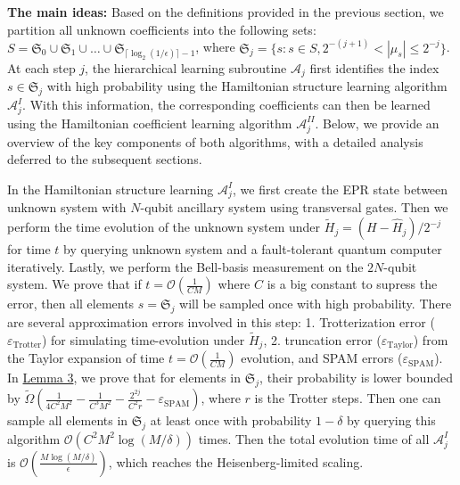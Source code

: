 \documentclass[twocolumn,superscriptaddress,aps,showpacs,amsmath,amstex,amssymb,citeautoscript,floatfix,pra,preprintnumbers]{revtex4-2}
\newcounter{alg}
\theoremstyle{plain}
\theoremstyle{plain}
\theoremstyle{plain}
\theoremstyle{plain}
\theoremstyle{plain}
\theoremstyle{plain}
\begin{document}
\begin{appendix}
\textbf{The main ideas: }Based on the definitions provided in the previous section, we partition all unknown coefficients into the following sets: $S=\mathfrak{S}_{0}\cup \mathfrak{S}_{1}\cup\dots\cup \mathfrak{S}_{\lceil\log_2(1/\epsilon)\rceil-1}$, where $\mathfrak{S}_j = \{s: s\in S, 2^{-(j+1)} < |\mu_s|\leq 2^{-j}\}$. At each step $j$, the hierarchical learning subroutine $\mathcal{A}_j$ first identifies the index $s \in \mathfrak{S}_j$ with high probability using the Hamiltonian structure learning algorithm  $\mathcal{A}_j^{I}$. With this information, the corresponding coefficients can then be learned using the Hamiltonian coefficient learning algorithm  $\mathcal{A}_j^{II}$. Below, we provide an overview of the key components of both algorithms, with a detailed analysis deferred to the subsequent sections.

In the Hamiltonian structure learning $\mathcal{A}_{j}^{I}$, we first create the EPR state between unknown system with $N$-qubit ancillary system using transversal gates. Then we perform the time evolution of the unknown system under $\tilde{H}_j = (H-\hat{H}_j)/2^{-j}$ for time $t$ by querying unknown system and a fault-tolerant quantum computer iteratively. Lastly, we perform the Bell-basis measurement on the $2N$-qubit system. We prove that if $t=\mathcal{O}\left(\frac{1}{CM}\right)$ where $C$ is a big constant to supress the error, then all elements $s=\mathfrak{S}_j$ will be sampled once with high probability. There are several approximation errors involved in this step: 1. Trotterization error ($\varepsilon_{\mathrm{Trotter}}$) for simulating time-evolution under $\tilde{H}_j$, 2. truncation error ($\varepsilon_{\mathrm{Taylor}}$) from the Taylor expansion of time $t=\mathcal{O}\left(\frac{1}{CM}\right)$ evolution, and SPAM errors ($\varepsilon_{\mathrm{SPAM}}$). In \hyperref[lem:lower_bound_for_prob_dist]{Lemma 3}, we prove that for elements in $\mathfrak{S}_j$, their probability is lower bounded by 
$\widetilde{\Omega}\left(\frac{1}{4C^2M^2}-\frac{1}{C^3M^2}-\frac{2^{2j}}{C^2r}-\varepsilon_{\text{SPAM}}\right)$, where $r$ is the Trotter steps. Then one can sample all elements in $\mathfrak{S}_j$ at least once with probability $1-\delta$ by querying this algorithm $\mathcal{O}(C^2M^2\log(M/\delta))$ times. Then the total evolution time of all $\mathcal{A}^{I}_j$ is $\mathcal{O}\left(\frac{M \log(M/\delta)}{\epsilon}\right)$, which reaches the Heisenberg-limited scaling.



\end{appendix}
\end{document}

